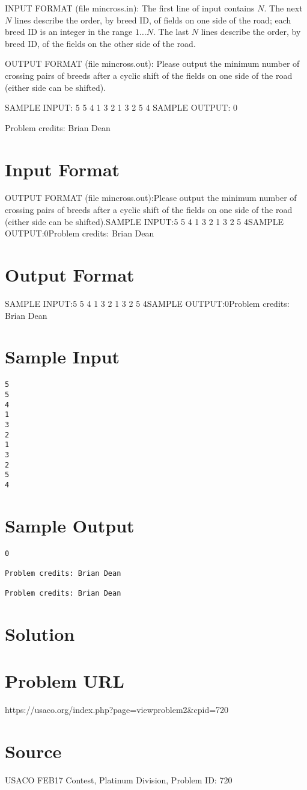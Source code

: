 \documentclass[12pt]{article}
\begin{document}
INPUT FORMAT (file mincross.in):
The first line of input contains $N$.  The next $N$ lines describe the order, by
breed ID, of fields on one side of the road; each breed ID is an integer in the
range $1 \ldots N$.  The last $N$ lines describe the order, by  breed ID, of the
fields on the other side of the road.

OUTPUT FORMAT (file mincross.out):
Please output the minimum number of crossing pairs of breeds after a cyclic
shift of the fields on one side of the road (either side can be shifted).

SAMPLE INPUT:
5
5
4
1
3
2
1
3
2
5
4
SAMPLE OUTPUT: 
0


Problem credits: Brian Dean



\section*{Input Format}
OUTPUT FORMAT (file mincross.out):Please output the minimum number of crossing pairs of breeds after a cyclic
shift of the fields on one side of the road (either side can be shifted).SAMPLE INPUT:5
5
4
1
3
2
1
3
2
5
4SAMPLE OUTPUT:0Problem credits: Brian Dean

\section*{Output Format}
SAMPLE INPUT:5
5
4
1
3
2
1
3
2
5
4SAMPLE OUTPUT:0Problem credits: Brian Dean

\section*{Sample Input}
\begin{verbatim}
5
5
4
1
3
2
1
3
2
5
4
\end{verbatim}

\section*{Sample Output}
\begin{verbatim}
0

Problem credits: Brian Dean

Problem credits: Brian Dean
\end{verbatim}

\section*{Solution}


\section*{Problem URL}
https://usaco.org/index.php?page=viewproblem2&cpid=720

\section*{Source}
USACO FEB17 Contest, Platinum Division, Problem ID: 720
\end{document}
